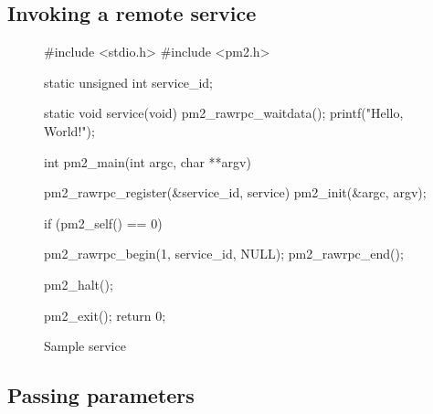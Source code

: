 \documentclass[a4paper,11pt]{report}
\begin{document}
\subsection{Invoking a remote service}

\begin{figure}[p]
\begin{center}
\begin{boxedminipage}{0.8\textwidth}
\begin{footnotesize}
\begin{listing}{0}
 #include <stdio.h>
 #include <pm2.h>

 static unsigned int service_id;

 static void service(void)
 {
   pm2_rawrpc_waitdata();
   printf("Hello, World!\n");
 }

 int pm2_main(int argc, char **argv)
 {
   pm2_rawrpc_register(&service_id, service)
   pm2_init(&argc, argv);

   if (pm2_self() == 0)
     {
       pm2_rawrpc_begin(1, service_id, NULL);
       pm2_rawrpc_end();

       pm2_halt();
     }
   pm2_exit();
   return 0;
 }
\end{listing}
\end{footnotesize}
\end{boxedminipage}
\end{center}
\caption{Sample service\label{fig:ex3}}
\end{figure}

\afterpage{\clearpage}

\subsection{Passing parameters}
\end{document}
